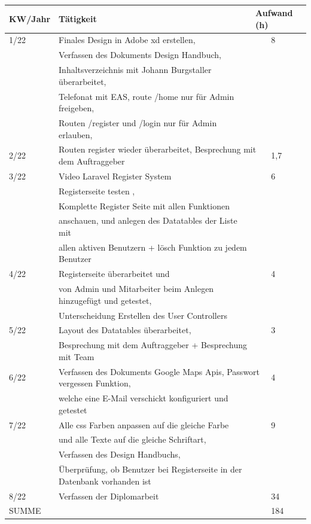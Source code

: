 \begin{table}[h]
	\caption{}
	\label{tab:myy-table}
	\begin{tabular}{|l|lll|}
		\hline
		KW/Jahr &
		\multicolumn{1}{l|}{Tätigkeit} &
		\multicolumn{2}{l|}{Aufwand (h)} \\ \hline
		
		1/22 &
		\multicolumn{2}{l|}{Finales Design in Adobe xd erstellen,   } &
		8 \\&Verfassen des Dokuments Design Handbuch,\\&Inhaltsverzeichnis mit Johann Burgstaller überarbeitet,\\ &Telefonat mit EAS, route /home nur für Admin freigeben,\\& Routen /register und /login nur für Admin erlauben,\\\hline
		2/22 &
		\multicolumn{2}{l|}{Routen register wieder überarbeitet, Besprechung mit dem Auftraggeber} &
		1,7 \\ \hline
		3/22 &
		\multicolumn{2}{l|}{Video Laravel Register System  } &
		6 \\& Registerseite testen ,\\ & Komplette Register Seite mit allen Funktionen\\&anschauen, und anlegen des Datatables der Liste mit\\&allen aktiven Benutzern + lösch Funktion zu jedem Benutzer\\\hline
		4/22 &
		\multicolumn{2}{l|}{Registerseite überarbeitet und } &
		4 \\ & von Admin und Mitarbeiter beim Anlegen hinzugefügt und getestet,\\&Unterscheidung Erstellen des User Controllers\\\hline
		5/22 &
		\multicolumn{2}{l|}{Layout des Datatables überarbeitet, } &
		3 \\ &Besprechung mit dem Auftraggeber + Besprechung mit Team\\\hline
		6/22 &
		\multicolumn{2}{l|}{Verfassen des Dokuments Google Maps Apis, Passwort vergessen Funktion, } &
		4 \\ &welche eine E-Mail verschickt konfiguriert und getestet\\\hline
		7/22 &
		\multicolumn{2}{l|}{Alle css Farben anpassen auf die gleiche Farbe   } &
		9 \\ &und alle Texte auf die gleiche Schriftart,\\&Verfassen des Design Handbuchs,\\&Überprüfung, ob Benutzer bei Registerseite in der Datenbank vorhanden ist\\\hline
		8/22 &
		\multicolumn{2}{l|}{Verfassen der Diplomarbeit} &
		34 \\ \hline
		SUMME &
		\multicolumn{2}{l|}{} &
		184 \\ \hline
	\end{tabular}
\end{table}
\newpage
